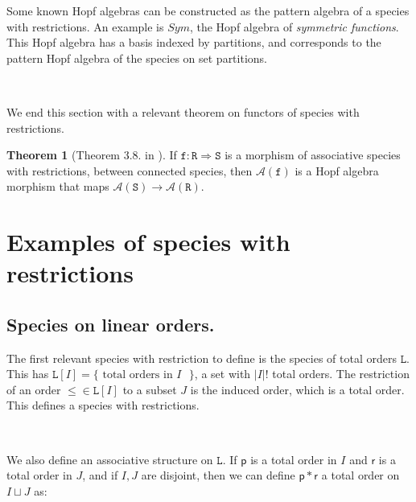 \documentclass[12pt, reqno]{amsart}
\theoremstyle{definition}
\newtheorem{thm}{Theorem}[section]
\newcommand{\prR}{\mathtt{R}}
\begin{document}
Some known Hopf algebras can be constructed as the pattern algebra of a species with restrictions.
An example is $Sym$, the Hopf algebra of \textit{symmetric functions}.
This Hopf algebra has a basis indexed by partitions, and corresponds to the pattern Hopf algebra of the species on set partitions.

\

We end this section with a relevant theorem on functors of species with restrictions.

\begin{thm}[Theorem 3.8. in \cite{Penaguiao2020}]\label{thm:functoriality}
    If $\mathtt{f} : \prR \Rightarrow \mathtt{S}$ is a morphism of associative species with restrictions, between connected species, then $\mathcal A(\mathtt{f})$ is a Hopf algebra morphism that maps $\mathcal A(\mathtt{S}) \to \mathcal A(\mathtt{R})$.
\end{thm}

\section{Examples of species with restrictions \label{sec:species_restrictions}}

\subsection{Species on linear orders.\label{sec:specieslinearorders}}

The first relevant species with restriction to define is the species of total orders $\mathtt{L}$.
This has $\mathtt{L}[I] = \{\text{ total orders in $I$ }\}$, a set with $|I|!$ total orders.
The restriction of an order $\leq \in \mathtt{L}[I]$ to a subset $J$ is the induced order, which is a total order.
This defines a species with restrictions.

\

We also define an associative structure on $\mathtt{L}$.
If $\mathsf{p}$ is a total order in $I$ and $\mathsf{r}$ is a total order in $J$, and if $I, J$ are disjoint, then we can define $\mathsf{p} \ast\mathsf{r}$ a total order on $I \sqcup J$ as:
\end{document}
